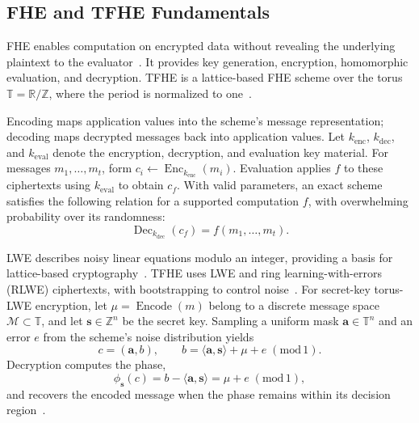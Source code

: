 \documentclass[sigconf,anonymous,balance=false]{acmart}
\newcommand{\bodypar}{\par\vskip 0pt plus 6pt\relax}
\begin{document}
\subsection{FHE and TFHE Fundamentals}
FHE enables computation on encrypted data without revealing the underlying plaintext to the evaluator~\cite{gentry2009fhe}. It provides key generation, encryption, homomorphic evaluation, and decryption. TFHE is a lattice-based FHE scheme over the torus $\mathbb{T}=\mathbb{R}/\mathbb{Z}$, where the period is normalized to one~\cite{chillotti2020tfhe}.
\bodypar

Encoding maps application values into the scheme's message representation; decoding maps decrypted messages back into application values. Let $k_{\mathrm{enc}}$, $k_{\mathrm{dec}}$, and $k_{\mathrm{eval}}$ denote the encryption, decryption, and evaluation key material. For messages $m_1,\ldots,m_t$, form $c_i\leftarrow\operatorname{Enc}_{k_{\mathrm{enc}}}(m_i)$. Evaluation applies $f$ to these ciphertexts using $k_{\mathrm{eval}}$ to obtain $c_f$. With valid parameters, an exact scheme satisfies the following relation for a supported computation $f$, with overwhelming probability over its randomness:
\begin{equation}
  \operatorname{Dec}_{k_{\mathrm{dec}}}(c_f)=f(m_1,\ldots,m_t).
  \label{eq:fhe-correctness}
\end{equation}
\bodypar

LWE describes noisy linear equations modulo an integer, providing a basis for lattice-based cryptography~\cite{regev2009lwe}. TFHE uses LWE and ring learning-with-errors (RLWE) ciphertexts, with bootstrapping to control noise~\cite{chillotti2020tfhe}. For secret-key torus-LWE encryption, let $\mu=\operatorname{Encode}(m)$ belong to a discrete message space $\mathcal{M}\subset\mathbb{T}$, and let $\mathbf{s}\in\mathbb{Z}^{n}$ be the secret key. Sampling a uniform mask $\mathbf{a}\in\mathbb{T}^{n}$ and an error $e$ from the scheme's noise distribution yields
\begin{equation}
  c=(\mathbf{a},b),\qquad
  b=\langle\mathbf{a},\mathbf{s}\rangle+\mu+e\;(\mathrm{mod}\,1).
  \label{eq:torus-lwe-encryption}
\end{equation}
Decryption computes the phase,
\begin{equation}
  \phi_{\mathbf{s}}(c)=b-\langle\mathbf{a},\mathbf{s}\rangle
  =\mu+e\;(\mathrm{mod}\,1),
  \label{eq:torus-lwe-phase}
\end{equation}
and recovers the encoded message when the phase remains within its decision region~\cite{chillotti2020tfhe}.
\bodypar
\end{document}
